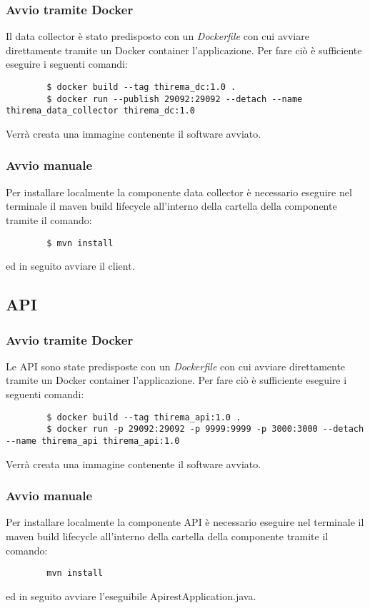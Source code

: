 		\subsubsection{Avvio tramite Docker}
		Il data collector è stato predisposto con un \textit{Dockerfile} con cui avviare direttamente tramite un Docker container l'applicazione. Per fare ciò è sufficiente eseguire i seguenti comandi:
		\begin{verbatim}
		$ docker build --tag thirema_dc:1.0 .
		$ docker run --publish 29092:29092 --detach --name thirema_data_collector thirema_dc:1.0
		\end{verbatim}
		Verrà creata una immagine contenente il software avviato.

		\subsubsection{Avvio manuale}
		Per installare localmente la componente data collector è necessario eseguire nel terminale il maven build lifecycle all'interno della cartella della componente tramite il comando:
		\begin{verbatim}
		$ mvn install
		\end{verbatim}
		ed in seguito avviare il client.

	\subsection{API}

		\subsubsection{Avvio tramite Docker}
		Le API sono state predisposte con un \textit{Dockerfile} con cui avviare direttamente tramite un Docker container l'applicazione. Per fare ciò è sufficiente eseguire i seguenti comandi:
		\begin{verbatim}
		$ docker build --tag thirema_api:1.0 .
		$ docker run -p 29092:29092 -p 9999:9999 -p 3000:3000 --detach --name thirema_api thirema_api:1.0
		\end{verbatim}
		Verrà creata una immagine contenente il software avviato.

		\subsubsection{Avvio manuale}
		Per installare localmente la componente API è necessario eseguire nel terminale il maven build lifecycle all'interno della cartella della componente tramite il comando:
		\begin{verbatim}
		mvn install
		\end{verbatim}
		ed in seguito avviare l'eseguibile ApirestApplication.java.

